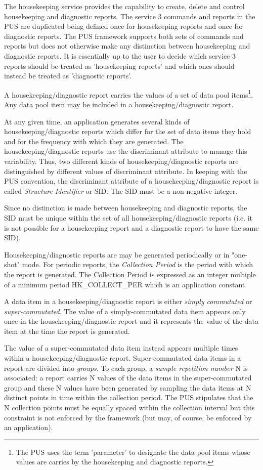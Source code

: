 \documentclass[a4paper,10pt]{article}
\begin{document}
The housekeeping service provides the capability to create, delete and control housekeeping and diagnostic reports. The service 3 commands and reports in the PUS are duplicated being defined once for housekeeping reports and once for diagnostic reports. The PUS framework supports both sets of commands and reports but does not otherwise make any distinction between housekeeping and diagnostic reports. It is essentially up to the user to decide which service 3 reports should be treated as 'housekeeping reports' and which ones should instead be treated as 'diagnostic reports'.

A housekeeping/diagnostic report carries the values of a set of data pool items\footnote{The PUS uses the term 'parameter' to designate the data pool items whose values are carries by the housekeeping and diagnostic reports.}. Any data pool item may be included in a housekeeping/diagnostic report. 

At any given time, an application generates several kinds of housekeeping/diagnostic reports which differ for the set of data items they hold and for the frequency with which they are generated. The housekeeping/diagnostic reports use the discriminant attribute to manage this variability. Thus, two different kinds of housekeeping/diagnostic reports are distinguished by different values of discriminant attribute. In keeping with the PUS convention, the discriminant attribute of a housekeeping/diagnostic report is called \textit{Structure Identifier} or SID. The SID must be a non-negative integer. 

Since no distinction is made between housekeeping and diagnostic reports, the SID must be unique within the set of all housekeeping/diagnostic reports (i.e. it is not possible for a housekeeping report and a diagnostic report to have the same SID).

Housekeeping/diagnostic reports are may be generated periodically or in "one-shot" mode. For periodic reports, the \textit{Collection Period} is the period with which the report is generated. The Collection Period is expressed as an integer multiple of a minimum period HK\_COLLECT\_PER which is an application constant. 

A data item in a housekeeping/diagnostic report is either \textit{simply commutated} or \textit{super-commutated}. The value of a simply-commutated data item appears only once in the housekeeping/diagnostic report and it represents the value of the data item at the time the report is generated.

The value of a super-commutated data item instead appears multiple times within a housekeeping/diagnostic report. Super-commutated data items in a report are divided into \textit{groups}. To each group, a \textit{sample repetition number} N is associated: a report carries N values of the data items in the super-commutated group and these N values have been generated by sampling the data items at N distinct points in time within the collection period. The PUS stipulates that the N collection points must be equally spaced within the collection interval but this constraint is not enforced by the framework (but may, of course, be enforced by an application). 
\end{document}
